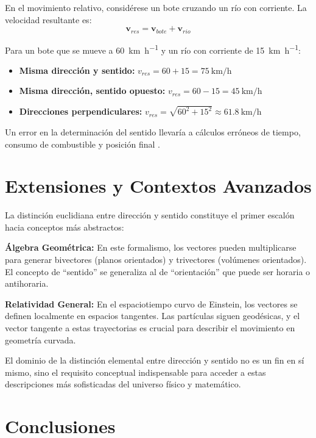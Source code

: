 \documentclass[conference]{IEEEtran}
\begin{document}
En el movimiento relativo, considérese un bote cruzando un río con corriente. La velocidad resultante es:
\begin{equation}
\mathbf{v}_{res} = \mathbf{v}_{bote} + \mathbf{v}_{rio}
\end{equation}

Para un bote que se mueve a \SI{60}{\kilo\meter\per\hour} y un río con corriente de \SI{15}{\kilo\meter\per\hour}:

\begin{itemize}
\item \textbf{Misma dirección y sentido:} $v_{res} = 60 + 15 = \SI{75}{\kilo\meter\per\hour}$
\item \textbf{Misma dirección, sentido opuesto:} $v_{res} = 60 - 15 = \SI{45}{\kilo\meter\per\hour}$
\item \textbf{Direcciones perpendiculares:} $v_{res} = \sqrt{60^2 + 15^2} \approx \SI{61.8}{\kilo\meter\per\hour}$
\end{itemize}

Un error en la determinación del sentido llevaría a cálculos erróneos de tiempo, consumo de combustible y posición final \cite{tripod2020cinematica}.

\section{Extensiones y Contextos Avanzados}

La distinción euclidiana entre dirección y sentido constituye el primer escalón hacia conceptos más abstractos:

\textbf{Álgebra Geométrica:} En este formalismo, los vectores pueden multiplicarse para generar bivectores (planos orientados) y trivectores (volúmenes orientados). El concepto de ``sentido'' se generaliza al de ``orientación'' que puede ser horaria o antihoraria.

\textbf{Relatividad General:} En el espaciotiempo curvo de Einstein, los vectores se definen localmente en espacios tangentes. Las partículas siguen geodésicas, y el vector tangente a estas trayectorias es crucial para describir el movimiento en geometría curvada.

El dominio de la distinción elemental entre dirección y sentido no es un fin en sí mismo, sino el requisito conceptual indispensable para acceder a estas descripciones más sofisticadas del universo físico y matemático.

\section{Conclusiones}
\end{document}
